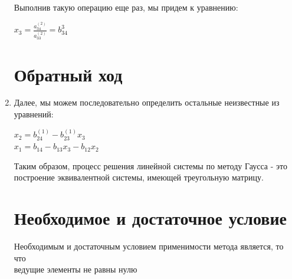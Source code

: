 \documentclass[12pt,letterpaper]{article}
\begin{document}
\begin{enumerate}
Выполнив такую операцию еще раз, мы придем к уравнению:

\begin{center}
    $x_3 = \frac{a_{34}^{(2)}}{a_{33}^{(2)}} = b_{34}^{3}$
\end{center}
\section*{Обратный ход}

\item Далее, мы можем последовательно определить остальные неизвестные из уравнений:

\begin{center}
\begin{flushleft}
    $x_2 = b_{24}^{(1)} - b_{23}^{(1)}x_3$ \\
    $x_1 = b_{14} - b_{13}x_3 - b_{12}x_2$
    \end{flushleft}
\end{center}

Таким образом, процесс решения линейной системы по методу Гаусса - это построение эквивалентной системы, имеющей треугольную матрицу.

\section*{Необходимое и достаточное условие}
Необходимым и достаточным условием применимости метода является, то что \\ ведущие элементы  не равны нулю

\end{enumerate}
\end{document}
